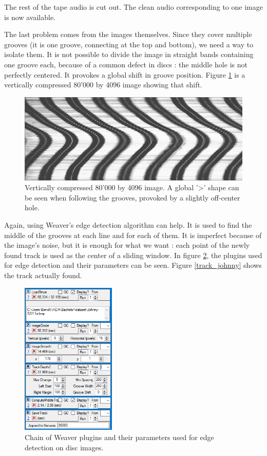 \documentclass[12pt, twoside]{article}
\begin{document}
The rest of the tape audio is cut out. The clean audio corresponding to one image is now available.

The last problem comes from the images themselves. Since they cover multiple grooves (it is one groove, connecting at the top and bottom), we need a way to isolate them. It is not possible to divide the image in straight bands containing one groove each, because of a common defect in discs : the middle hole is not perfectly centered. It provokes a global shift in groove position. Figure \ref{moving_groove} is a vertically compressed 80'000 by 4096 image showing that shift.

\begin{figure}
	\centering
	\includegraphics[width=1.0\textwidth]{../images/moving_groove.png}
	\caption{Vertically compressed 80'000 by 4096 image. A global '>' shape can be seen when following the grooves, provoked by a slightly off-center hole.}
	\label{moving_groove}
\end{figure}

Again, using Weaver's edge detection algorithm can help. It is used to find the middle of the grooves at each line and for each of them. It is imperfect because of the image's noise, but it is enough for what we want : each point of the newly found track is used as the center of a sliding window. In figure \ref{track_plugins}, the plugins used for edge detection and their parameters can be seen. Figure \ref{track_johnny} shows the track actually found.

\begin{figure}
	\centering
	\includegraphics[width=0.4\textwidth]{../images/track_plugins.png}
	\caption{Chain of Weaver plugins and their parameters used for edge detection on disc images.}
	\label{track_plugins}
\end{figure}
\end{document}
